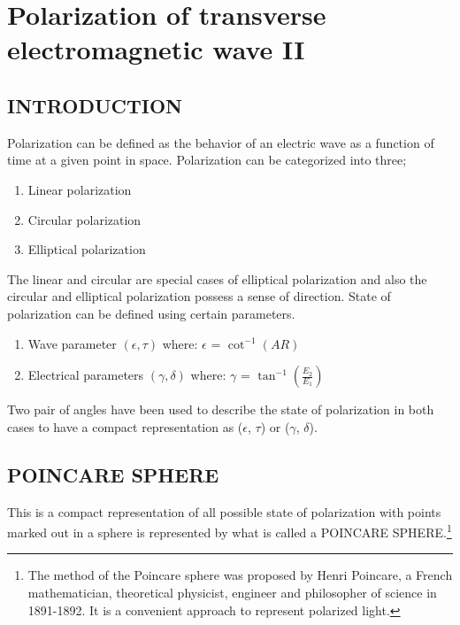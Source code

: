 \chapter{Polarization of transverse electromagnetic wave II}
	\section{INTRODUCTION}
	
	Polarization can be defined as the behavior of an electric wave as a function of time at a given point in space. Polarization can be categorized into three; 
	\begin{enumerate}
		\item Linear polarization
		\item Circular polarization
		\item Elliptical polarization
	\end{enumerate}
	The linear and circular are special cases of elliptical polarization and also the circular and elliptical polarization possess a sense of direction. State of polarization can be defined using certain parameters.
	
	\begin{enumerate}
		\item Wave parameter $(\epsilon,\tau)$
		\newline where: $\epsilon$ = $\cot^{-1}(AR)$
		
		\item Electrical parameters $(\gamma, \delta)$
		\newline	where: $\gamma$ = $\tan^{-1} (\frac{E_{2}}{E_{1}})$
	\end{enumerate}
	
	Two pair of angles have been used to describe the state of polarization in both cases to have a compact representation as ($\epsilon$, $\tau$)  or ($\gamma$, $\delta$).
	
	\section{POINCARE SPHERE}
	
	This is a compact representation of all possible state of polarization with points marked out in a sphere is represented by what is called a POINCARE SPHERE.\footnote{The method of the Poincare sphere was proposed by Henri Poincare, a French mathematician, theoretical physicist, engineer and philosopher of science in 1891-1892. It is a convenient approach to represent polarized light.} 
	
